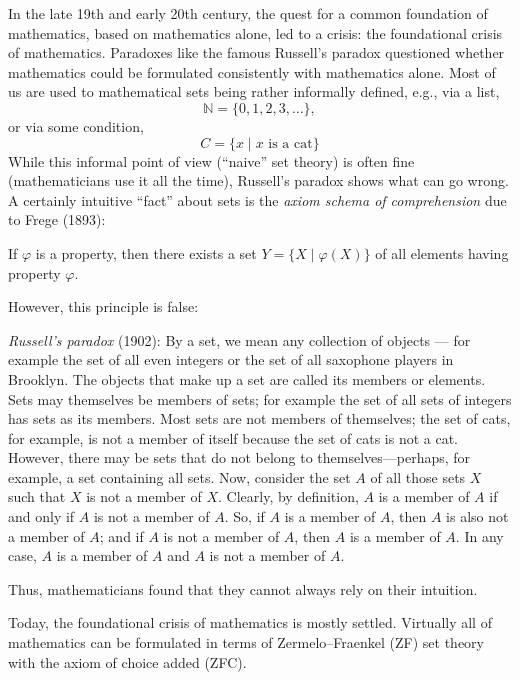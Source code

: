 In the late 19th and early 20th century, the quest for a common foundation of mathematics, based on mathematics alone, led to a crisis: the foundational crisis of mathematics\autocites{wiki:Foundations_of_mathematics,Ferreiros_TPCtM}. Paradoxes like the famous Russell's paradox questioned whether mathematics could be formulated consistently with mathematics alone. Most of us are used to mathematical sets being rather informally defined, e.g., via a list, 
\begin{equation}
    \mathbb{N} = \{ 0, 1, 2, 3, \ldots \}, 
\end{equation}
or via some condition,
\begin{equation}
    C = \{ x \mid \text{$x$ is a cat} \} 
\end{equation}
While this informal point of view (``naive'' set theory) is often fine (mathematicians use it all the time), 
Russell's paradox shows what can go wrong. A certainly intuitive ``fact'' about sets is the \emph{axiom schema of comprehension} due to Frege (1893)\autocites{Ciesielski1997_}: 
\begin{displayquote}
    If $\varphi$ is a property, then there exists a set $Y = \{ X \mid \varphi(X) \}$ of all elements having property $\varphi$.
\end{displayquote}
However, this principle is false:
\begin{displayquote}
     \emph{Russell's paradox} (1902): By a set, we mean any collection of objects --- for example the set of all even integers or the set of all saxophone players in Brooklyn. The objects that make up a set are called its members or elements. Sets may themselves be members of sets; for example the set of all sets of integers has sets as its members. Most sets are not members of themselves; the set of cats, for example, is not a member of itself because the set of cats is not a cat. However, there may be sets that do not belong to themselves---perhaps, for example, a set containing all sets. Now, consider the set $A$ of all those sets $X$ such that $X$ is not a member of $X$. Clearly, by definition, $A$ is a member of $A$ if and only if $A$ is not a member of $A$. So, if $A$ is a member of $A$, then $A$ is also not a member of $A$; and if $A$ is not a member of $A$, then $A$ is a member of $A$. In any case, $A$ is a member of $A$ and $A$ is not a member of $A$.
\end{displayquote}
Thus, mathematicians found that they cannot always rely on their intuition.

Today, the foundational crisis of mathematics is mostly settled. Virtually all of mathematics can be formulated in terms of Zermelo--Fraenkel (ZF) set theory with the axiom of choice added (ZFC).

